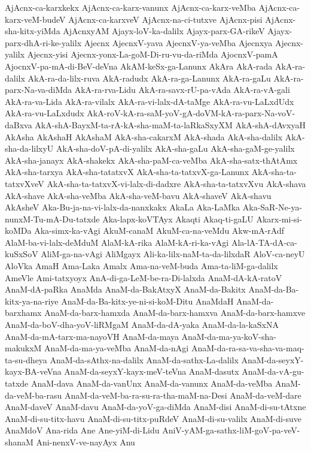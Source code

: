{AjAcnx-ca-karxkekx
AjAcnx-ca-karx-vanunx
AjAcnx-ca-karx-veMba
AjAcnx-ca-karx-veM-budeV
AjAcnx-ca-karxveV
AjAcnx-na-ci-tutxve
AjAcnx-pisi
AjAcnx-sha-kitx-yiMda
AjAcnxyAM
Ajayx-loV-ka-dalilx
Ajayx-parx-GA-rikeV
Ajayx-parx-dhA-ri-ke-yalilx
Ajecnx
AjecnxV-yava
AjecnxV-ya-veMba
Ajecnxya
Ajecnx-yalilx
Ajecnx-yisi
Ajecnx-yonx-La-goM-Di-ru-vu-da-riMda
AjocnxV-pamA
AjocnxV-pa-mA-di-BeV-deVna
AkAM-keSx-ga-Lanunx
AkAra
AkA-rada
AkA-ra-dalilx
AkA-ra-da-lilx-ruva
AkA-radudx
AkA-ra-ga-Lanunx
AkA-ra-gaLu
AkA-ra-parx-Na-va-diMda
AkA-ra-rva-Lidu
AkA-ra-savx-rU-pa-vAda
AkA-ra-vA-gali
AkA-ra-va-Lida
AkA-ra-vilalx
AkA-ra-vi-lalx-dA-taMge
AkA-ra-vu-LaLxdUdx
AkA-ra-vu-LaLxdudx
AkA-roV-kA-ra-saM-yoV-gA-doVM-kA-ra-parx-Na-voV-daBxva
AkA-shA-BayxM-ta-rA-kA-sha-maM-ta-laRkaSxyXM
AkA-shA-dAvxyaH
AkAsha
AkAshaH
AkAshaM
AkA-sha-cakarxM
AkA-shada
AkA-sha-dalilx
AkA-sha-da-lilxyU
AkA-sha-doV-pA-di-yalilx
AkA-sha-gaLu
AkA-sha-gaM-ge-yalilx
AkA-sha-janayx
AkA-shakekx
AkA-sha-paM-ca-veMba
AkA-sha-satx-thAtAmx
AkA-sha-tarxya
AkA-sha-tatatxvX
AkA-sha-ta-tatxvX-ga-Lanunx
AkA-sha-ta-tatxvXveV
AkA-sha-ta-tatxvX-vi-lalx-di-dadxre
AkA-sha-ta-tatxvXvu
AkA-shava
AkA-shave
AkA-sha-veMba
AkA-sha-veM-bavu
AkA-shaveV
AkA-shavu
AkAsheV
Aka-Bu-ja-na-vi-lalx-da-nanxkakx
AkaLa
Aka-LaMka
Aka-SaR-Ne-ya-nunxM-Tu-mA-Du-tatxde
Aka-lapx-koVTAyx
Akaqti
Akaq-ti-gaLU
Akarx-mi-si-koMDa
Aka-simx-ka-vAgi
AkuM-canaM
AkuM-ca-na-veMdu
Akw-mA-rAdf
AlaM-ba-vi-lalx-deMduM
AlaM-kA-rika
AlaM-kA-ri-ka-vAgi
Ala-lA-TA-dA-ca-kuSxSoV
AliM-ga-na-vAgi
AliMgayx
Ali-ka-lilx-naM-ta-da-lilxdaR
AloV-ca-neyU
AloVka
AmaH
Ama-Laka
Amalx
Ama-na-veM-buda
Ama-ta-liM-ga-dalilx
AmeVle
Ami-tatxyoyx
AnA-di-ga-LeM-be-ra-Di-lalxda
AnaM-dA-kA-ratoV
AnaM-dA-paRka
AnaMda
AnaM-da-BakAtxyX
AnaM-da-Bakitx
AnaM-da-Ba-kitx-ya-na-riye
AnaM-da-Ba-kitx-ye-ni-si-koM-Ditu
AnaMdaH
AnaM-da-barxhamx
AnaM-da-barx-hamxda
AnaM-da-barx-hamxva
AnaM-da-barx-hamxve
AnaM-da-boV-dha-yoV-liRMgaM
AnaM-da-dA-yaka
AnaM-da-la-kaSxNA
AnaM-da-mA-tarx-ma-nayoVH
AnaM-da-maya
AnaM-da-ma-ya-koV-sha-makukxM
AnaM-da-ma-ya-veMba
AnaM-da-nAgi
AnaM-da-ra-sa-va-sha-va-maq-ta-su-dheya
AnaM-da-sAthx-na-dalilx
AnaM-da-sathx-La-dalilx
AnaM-da-seyxY-kayx-BA-veVna
AnaM-da-seyxY-kayx-meV-teVna
AnaM-dasutx
AnaM-da-vA-gu-tatxde
AnaM-dava
AnaM-da-vanUnx
AnaM-da-vanunx
AnaM-da-veMba
AnaM-da-veM-ba-rasu
AnaM-da-veM-ba-ra-su-ra-tha-maM-na-Desi
AnaM-da-veM-dare
AnaM-daveV
AnaM-davu
AnaM-da-yoV-ga-diMda
AnaM-disi
AnaM-di-su-tAtxne
AnaM-di-su-titx-havu
AnaM-di-su-titx-puRdeV
AnaM-di-su-valilx
AnaM-di-suve
AnaMdoV
Ana-rida
Ane
Ane-yiM-di-Lidu
AniV-yAM-ga-sathx-liM-goV-pa-veV-shanaM
Ani-nenxV-ve-nayAyx
Anu
}
